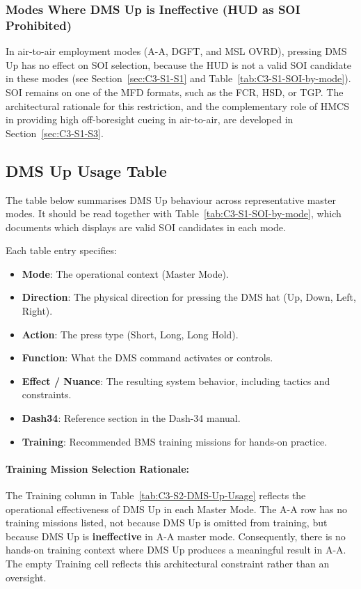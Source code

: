 \documentclass[11pt, a4paper, twoside]{report}
\begin{document}
\subsubsection{Modes Where DMS Up is Ineffective (HUD as SOI Prohibited)}
\label{sec:C3-S2-S1-S2}

In air-to-air employment modes (A-A, DGFT, and MSL OVRD), pressing DMS Up has no effect on SOI selection, because the HUD is not a valid SOI candidate in these modes (see Section~\ref{sec:C3-S1-S1} and Table~\ref{tab:C3-S1-SOI-by-mode}). SOI remains on one of the MFD formats, such as the FCR, HSD, or TGP. The architectural rationale for this restriction, and the complementary role of HMCS in providing high off-boresight cueing in air-to-air, are developed in Section~\ref{sec:C3-S1-S3}.

\subsection{DMS Up Usage Table}
\label{sec:C3-S2-S2}

The table below summarises DMS Up behaviour across representative master modes. It should be read together with Table~\ref{tab:C3-S1-SOI-by-mode}, which documents which displays are valid SOI candidates in each mode.

Each table entry specifies:

\begin{itemize}
	\item \textbf{Mode}: The operational context (Master Mode).
	\item \textbf{Direction}: The physical direction for pressing the DMS hat (Up, Down, Left, Right).
	\item \textbf{Action}: The press type (Short, Long, Long Hold).
	\item \textbf{Function}: What the DMS command activates or controls.
	\item \textbf{Effect / Nuance}: The resulting system behavior, including tactics and constraints.
	\item \textbf{Dash34}: Reference section in the Dash-34 manual.
	\item \textbf{Training}: Recommended BMS training missions for hands-on practice.
\end{itemize}

\paragraph{Training Mission Selection Rationale:} The Training column in Table~\ref{tab:C3-S2-DMS-Up-Usage} reflects the operational effectiveness of DMS Up in each Master Mode. The A-A row has no training missions listed, not because DMS Up is omitted from training, but because DMS Up is \textbf{ineffective} in A-A master mode. Consequently, there is no hands-on training context where DMS Up produces a meaningful result in A-A. The empty Training cell reflects this architectural constraint rather than an oversight.
\end{document}
